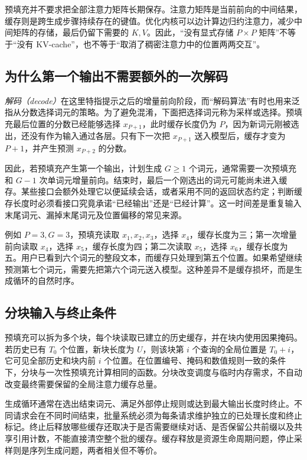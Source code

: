 \documentclass[UTF8,12pt,a4paper,fontset=fandol]{ctexart}
\begin{document}
预填充并不要求把全部注意力矩阵长期保存。注意力矩阵是当前前向的中间结果，缓存则是跨生成步骤持续存在的键值。优化内核可以边计算边归约注意力，减少中间矩阵的存储，最后仍留下需要的 $K,V$。因此，“没有显式存储 $P\times P$ 矩阵”不等于“没有 KV-cache”，也不等于“取消了稠密注意力中的位置两两交互”。

\subsection{为什么第一个输出不需要额外的一次解码}

\emph{解码（decode）}在这里特指提示之后的增量前向阶段，而“解码算法”有时也用来泛指从分数选择词元的策略。为了避免混淆，下面把选择词元称为采样或选择。预填充最后位置的分数已经能够选择 $x_{P+1}$，此时缓存长度仍为 $P$，因为新词元刚被选出，还没有作为输入通过各层。只有下一次把 $x_{P+1}$ 送入模型后，缓存才变为 $P+1$，并产生预测 $x_{P+2}$ 的分数。

因此，若预填充产生第一个输出，计划生成 $G\geq1$ 个词元，通常需要一次预填充和 $G-1$ 次单词元增量前向。结束时，最后一个刚选出的词元可能尚未进入缓存。某些接口会额外处理它以便延续会话，或者采用不同的返回状态约定；判断缓存长度时必须看接口究竟承诺“已经输出”还是“已经计算”。这一时间差是重复输入末尾词元、漏掉末尾词元及位置偏移的常见来源。

例如 $P=3,G=3$，预填充读取 $x_1,x_2,x_3$，选择 $x_4$，缓存长度为三；第一次增量前向读取 $x_4$，选择 $x_5$，缓存长度为四；第二次读取 $x_5$，选择 $x_6$，缓存长度为五。用户已看到六个词元的整段文本，而缓存只处理到第五个位置。如果希望继续预测第七个词元，需要先把第六个词元送入模型。这种差异不是缓存损坏，而是生成循环的自然时序。

\subsection{分块输入与终止条件}

预填充可以拆为多个块，每个块读取已建立的历史缓存，并在块内使用因果掩码。若历史已有 $T_0$ 个位置，新块长度为 $U$，则该块第 $i$ 个查询的全局位置是 $T_0+i$，它可见全部历史和块内前 $i$ 个位置。在位置编号、掩码和数值规则一致的条件下，分块与一次性预填充计算相同的函数。分块改变调度与临时内存需求，不自动改变最终需要保留的全局注意力缓存总量。

生成循环通常在选出结束词元、满足外部停止规则或达到最大输出长度时终止。不同请求会在不同时间结束，批量系统必须为每条请求维护独立的已处理长度和终止标记。终止后释放哪些缓存还取决于是否需要继续对话、是否保留公共前缀以及共享引用计数，不能直接清空整个批的缓存。缓存释放是资源生命周期问题，停止采样则是序列生成问题，两者相关但不等价。
\end{document}

